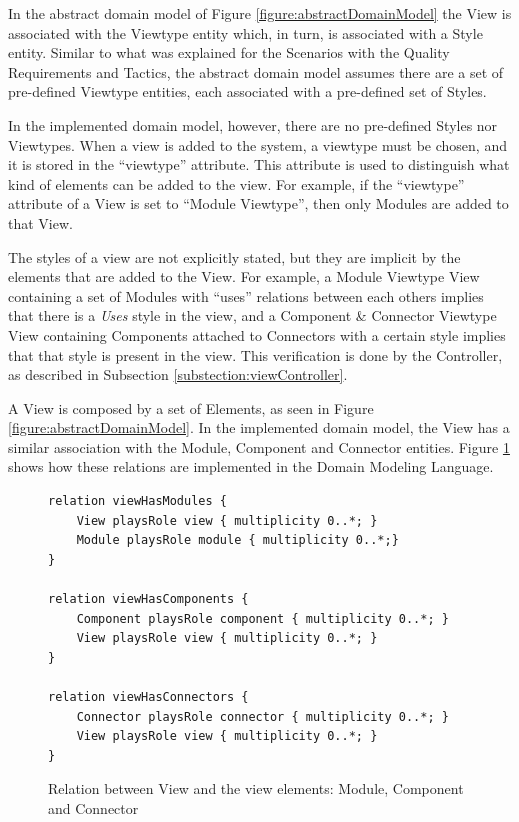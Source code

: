 In the abstract domain model of Figure \ref{figure:abstractDomainModel} the View is associated with the Viewtype entity which, in turn, is associated with a Style entity. Similar to what was explained for the Scenarios with the Quality Requirements and Tactics, the abstract domain model assumes there are a set of pre-defined Viewtype entities, each associated with a pre-defined set of Styles. 

In the implemented domain model, however, there are no pre-defined Styles nor Viewtypes. When a view is added to the system, a viewtype must be chosen, and it is stored in the ``viewtype'' attribute. This attribute is used to distinguish what kind of elements can be added to the view. For example, if the ``viewtype'' attribute of a View is set to ``Module Viewtype'', then only Modules are added to that View. 

The styles of a view are not explicitly stated, but they are implicit by the elements that are added to the View. For example, a Module Viewtype View containing a set of Modules with ``uses'' relations between each others implies that there is a \textit{Uses} style in the view, and a Component \& Connector Viewtype View containing Components attached to Connectors with a certain style implies that that style is present in the view. This verification is done by the Controller, as described in Subsection \ref{substection:viewController}.

A View is composed by a set of Elements, as seen in Figure \ref{figure:abstractDomainModel}. In the implemented domain model, the View has a similar association with the Module, Component and Connector entities. Figure \ref{figure:modelviewelements} shows how these relations are implemented in the Domain Modeling Language.

\begin{figure}[h]
\lstset{style=customjava}
\begin{lstlisting}
relation viewHasModules {
	View playsRole view { multiplicity 0..*; }
	Module playsRole module { multiplicity 0..*;}
}

relation viewHasComponents {
	Component playsRole component { multiplicity 0..*; }
	View playsRole view { multiplicity 0..*; }
}

relation viewHasConnectors {
	Connector playsRole connector { multiplicity 0..*; }
	View playsRole view { multiplicity 0..*; }
}
\end{lstlisting}
\caption{Relation between View and the view elements: Module, Component and Connector}
\label{figure:modelviewelements}
\end{figure}

